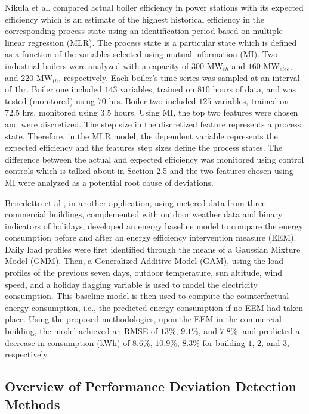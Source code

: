 Nikula et al.\cite{boiler} compared actual boiler efficiency in power stations with its expected efficiency which is an estimate of the highest historical efficiency in the corresponding process state using an identification period based on multiple linear regression (MLR). The process state is a particular state which is defined as a function of the variables selected using mutual information (MI). Two industrial boilers were analyzed with a capacity of $300$ $\text{MW}_{th}$ and $160$ $\text{MW}_{elec}$, and $220$ $\text{MW}_{th}$, respectively. Each boiler's time series was sampled at an interval of $1$hr. Boiler one included $143$ variables, trained on $810$ hours of data, and was tested (monitored) using $70$ hrs. Boiler two included $125$ variables, trained on $72.5$ hrs, monitored using $3.5$ hours. Using MI, the top two features were chosen and were discretized. The step size in the discretized feature represents a process state. Therefore, in the MLR model, the dependent variable represents the expected efficiency and the features step sizes define the process states. The difference between the actual and expected efficiency was monitored using control controls which is talked about in \hyperlink{subsection.2.5}{Section 2.5} and the two features chosen using MI were analyzed as a potential root cause of deviations.

Benedetto et al \cite{data-driven-MV}, in another application, using metered data from three commercial buildings, complemented with outdoor weather data and binary indicators of holidays, developed an energy baseline model to compare the energy consumption before and after an energy efficiency intervention measure (EEM). Daily load profiles were first identified through the means of a Gaussian Mixture Model (GMM). Then, a Generalized Additive Model (GAM), using the load profiles of the previous seven days, outdoor temperature, sun altitude, wind speed, and a holiday flagging variable is used to model the electricity consumption. This baseline model is then used to compute the counterfactual energy consumption, i.e., the predicted energy consumption if no EEM had taken place. Using the proposed methodologies, upon the EEM in the commercial building, the model achieved an RMSE of $13\%$, $9.1\%$, and $7.8\%$, and predicted a decrease in consumption (kWh) of $8.6\%$, $10.9\%$, $8.3\%$ for building $1$, $2$, and $3$, respectively.

\subsection{Overview of Performance Deviation Detection Methods}

